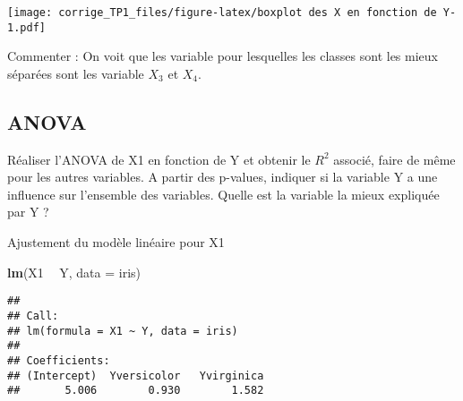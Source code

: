 \documentclass[
]{article}
\newenvironment{Shaded}{\begin{snugshade}}{\end{snugshade}}
\newcommand{\DataTypeTok}[1]{\textcolor[rgb]{0.13,0.29,0.53}{#1}}
\newcommand{\KeywordTok}[1]{\textcolor[rgb]{0.13,0.29,0.53}{\textbf{#1}}}
\newcommand{\NormalTok}[1]{#1}
\newcommand{\OperatorTok}[1]{\textcolor[rgb]{0.81,0.36,0.00}{\textbf{#1}}}
\newcommand{\StringTok}[1]{\textcolor[rgb]{0.31,0.60,0.02}{#1}}
\begin{document}
\begin{Shaded}
\end{Shaded}

\texttt{[image: corrige\_TP1\_files/figure-latex/boxplot des X en fonction de Y-1.pdf]}

Commenter : On voit que les variable pour lesquelles les classes sont
les mieux séparées sont les variable \(X_3\) et \(X_4\).

\hypertarget{anova}{%
\subsection{ANOVA}\label{anova}}

Réaliser l'ANOVA de X1 en fonction de Y et obtenir le \(R^2\) associé,
faire de même pour les autres variables. A partir des p-values, indiquer
si la variable Y a une influence sur l'ensemble des variables. Quelle
est la variable la mieux expliquée par Y ?

Ajustement du modèle linéaire pour X1

\begin{Shaded}
\begin{Highlighting}[]
\KeywordTok{lm}\NormalTok{(X1 }\OperatorTok{~}\StringTok{ }\NormalTok{Y, }\DataTypeTok{data =}\NormalTok{ iris)}
\end{Highlighting}
\end{Shaded}

\begin{verbatim}
## 
## Call:
## lm(formula = X1 ~ Y, data = iris)
## 
## Coefficients:
## (Intercept)  Yversicolor   Yvirginica  
##       5.006        0.930        1.582
\end{verbatim}

\begin{Shaded}
\end{Shaded}
\end{document}
